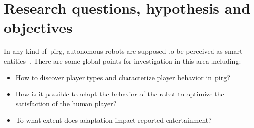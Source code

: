 
\section{Research questions, hypothesis and objectives}\label{sec:research_question}
In any kind of~\gls{pirg}, autonomous robots are supposed to be perceived as smart entities~\citep{martinoia_physically_2013, bonarini_timing_2014}. There are some global points for investigation in this area including:

\begin{itemize}
\item How to discover player types and characterize player behavior in~\gls{pirg}? 
\item How is it possible to adapt the behavior of the robot to optimize the satisfaction of the human player?
\item To what extent does adaptation impact reported entertainment? %
\end{itemize}


